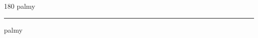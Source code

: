 
\begin{frame}
\begin{center}
\begin{turn}{180}
{\fontsize{2.5cm}{1em}\selectfont palmy}
\end{turn}
\vspace{1em}\par  
\hrule
\vspace{1em}\par  
{\fontsize{2.5cm}{1em}\selectfont palmy}
\end{center}
\end{frame}
